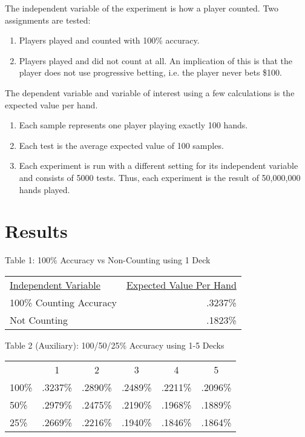 \documentclass[11pt,letterpaper]{article}
\begin{document}
The independent variable of the experiment is how a player counted. Two assignments are tested:
\begin{enumerate}
\item Players played and counted with 100\% accuracy.
\item Players played and did not count at all.
\subitem An implication of this is that the player does not use progressive betting, i.e. the player never bets \$100.
\end{enumerate}
The dependent variable and variable of interest using a few calculations is the expected value per hand.
\begin{enumerate}
\item Each sample represents one player playing exactly 100 hands.
\item Each test is the average expected value of 100 samples.
\item Each experiment is run with a different setting for its independent variable and consists of 5000 tests. Thus, each experiment is the result of 50,000,000 hands played.
\end{enumerate}

\part{Results}
	\begin{center}
	Table 1: 100\% Accuracy vs Non-Counting using 1 Deck\\
		\begin{tabular}{l r}
			\underline{Independent Variable} & 
			\underline{Expected Value Per Hand}\\
			100\% Counting Accuracy & .3237\%\\
			Not Counting & .1823\%
		\end{tabular}\newline\newline
		
	Table 2 (Auxiliary): 100/50/25\% Accuracy using 1-5 Decks\\
		\begin{tabular}{l c c c c c}
			{} & 
			1 & 2 & 3 & 4 & 5\\
			100\% 	& .3237\% & .2890\% & .2489\% & .2211\% & .2096\%\\
			50\% 	& .2979\% & .2475\% & .2190\% & .1968\% & .1889\%\\
			25\% 	& .2669\% & .2216\% & .1940\% & .1846\% & .1864\%\\
		\end{tabular}
	\end{center}
\end{document}
